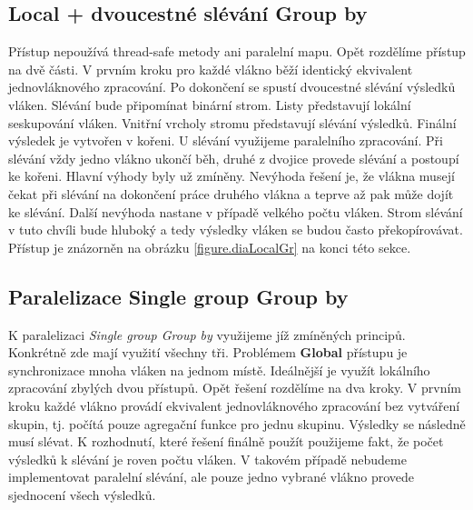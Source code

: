 \subsection{Local + dvoucestné slévání Group by} \label{anal.groupby.local}

Přístup nepoužívá thread-safe metody ani paralelní mapu.
Opět rozdělíme přístup na dvě části.
V prvním kroku pro každé vlákno běží identický ekvivalent jednovláknového zpracování.
Po dokončení se spustí dvoucestné slévání výsledků vláken.
Slévání bude připomínat binární strom.
Listy představují lokální seskupování vláken.
Vnitřní vrcholy stromu představují slévání výsledků.
Finální výsledek je vytvořen v kořeni.
U slévání využijeme paralelního zpracování.
Při slévání vždy jedno vlákno ukončí běh, druhé z dvojice provede slévání a postoupí ke kořeni. 
Hlavní výhody byly už zmíněny.
Nevýhoda řešení je, že vlákna musejí čekat při slévání na dokončení práce druhého vlákna a teprve až pak může dojít ke slévání.
Další nevýhoda nastane v případě velkého počtu vláken.
Strom slévání v tuto chvíli bude hluboký a tedy výsledky vláken se budou často překopírovávat. 
Přístup je znázorněn na obrázku \ref{figure.diaLocalGr} na konci této sekce.

\subsection{Paralelizace Single group Group by} \label{anal.groupby.singlegroup}

K paralelizaci \textit{Single group Group by} využijeme jíž zmíněných principů.
Konkrétně zde mají využití všechny tři.
Problémem \textbf{Global} přístupu je synchronizace mnoha vláken na jednom místě.
Ideálnější je využít lokálního zpracování zbylých dvou přístupů.
Opět řešení rozdělíme na dva kroky. 
V prvním kroku každé vlákno provádí ekvivalent jednovláknového zpracování bez vytváření skupin, tj. počítá pouze agregační funkce pro jednu skupinu.
Výsledky se následně musí slévat.
K rozhodnutí, které řešení finálně použít použijeme fakt, že počet výsledků k slévání je roven počtu vláken.
V takovém případě nebudeme implementovat paralelní slévání, ale pouze jedno vybrané vlákno provede sjednocení všech výsledků.


